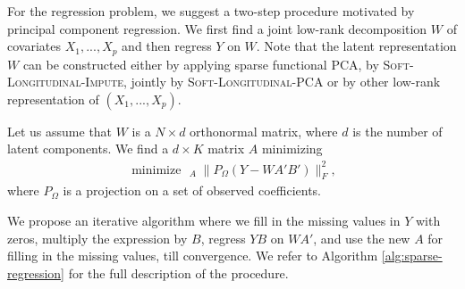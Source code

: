 \documentclass[preprint]{imsart}
\numberwithin{equation}{section}
\theoremstyle{plain}
\newcommand{\tr}[1]{{\textcolor{red}{#1}}}
\DeclareMathOperator*{\argmin}{arg\,min}
\DeclareMathOperator*{\minimize}{minimize\ \ }
\begin{document}

For the regression problem, we suggest a two-step procedure motivated by principal component regression. We first find a joint low-rank decomposition $W$ of covariates $X_1,...,X_p$ and then regress $Y$ on $W$. Note that the latent representation $W$ can be constructed either by applying sparse functional PCA, by \textsc{Soft-Longitudinal-Impute}, jointly by \textsc{Soft-Longitudinal-PCA} or by other low-rank representation of $(X_1,...,X_p)$.

Let us assume that $W$ is a $N \times d$ orthonormal matrix, where $d$ is the number of latent components. We find a $d \times K$ matrix $A$ minimizing
\begin{align}\label{eq:pcr}
\minimize_A \|P_\Omega(Y - WA'B')\|_F^2,
\end{align}
where $P_\Omega$ is a projection on a set of observed coefficients.

We propose an iterative algorithm where we fill in the missing values in $Y$ with zeros, multiply the expression by $B$, regress $YB$ on $WA'$, and use the new $A$ for filling in the missing values, till convergence. We refer to Algorithm \ref{alg:sparse-regression} for the full description of the procedure.



\end{document}
